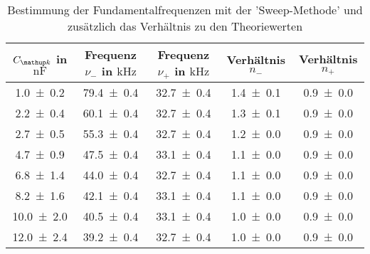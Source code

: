 \begin{table} 
\centering 
\caption{ Bestimmung der Fundamentalfrequenzen mit der 'Sweep-Methode' und zusätzlich das Verhältnis zu den Theoriewerten} 
\label{fig:teilc_schwingungen_prak_theo} 
\begin{tabular}{S S S S S } 
\toprule  
{$C\ua{k}$ in $\si{\nano\farad}$} & {Frequenz $\nu_-$ in $\si{\kilo\hertz}$} & {Frequenz $\nu_+$ in $\si{\kilo\hertz}$ }& {Verhältnis $n_-$} & {Verhältnis $n_+$}  \\ 
\midrule  
 \num{1.0\pm0.2} & \num{79.4\pm0.4} & \num{32.7\pm0.4} & \num{1.4\pm0.1} & \num{0.9\pm0.0}\\ 
\num{2.2\pm0.4} & \num{60.1\pm0.4} & \num{32.7\pm0.4} & \num{1.3\pm0.1} & \num{0.9\pm0.0}\\ 
\num{2.7\pm0.5} & \num{55.3\pm0.4} & \num{32.7\pm0.4} & \num{1.2\pm0.0} & \num{0.9\pm0.0}\\ 
\num{4.7\pm0.9} & \num{47.5\pm0.4} & \num{33.1\pm0.4} & \num{1.1\pm0.0} & \num{0.9\pm0.0}\\ 
\num{6.8\pm1.4} & \num{44.0\pm0.4} & \num{32.7\pm0.4} & \num{1.1\pm0.0} & \num{0.9\pm0.0}\\ 
\num{8.2\pm1.6} & \num{42.1\pm0.4} & \num{33.1\pm0.4} & \num{1.1\pm0.0} & \num{0.9\pm0.0}\\ 
\num{10.0\pm2.0} & \num{40.5\pm0.4} & \num{33.1\pm0.4} & \num{1.0\pm0.0} & \num{0.9\pm0.0}\\ 
\num{12.0\pm2.4} & \num{39.2\pm0.4} & \num{32.7\pm0.4} & \num{1.0\pm0.0} & \num{0.9\pm0.0}\\ 
\bottomrule 
\end{tabular} 
\end{table}